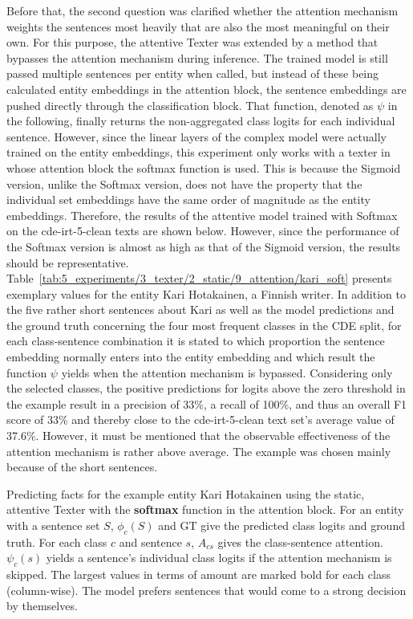 Before that, the second question was clarified whether the attention mechanism weights the sentences most heavily that are also the most meaningful on their own. For this purpose, the attentive Texter was extended by a method that bypasses the attention mechanism during inference. The trained model is still passed multiple sentences per entity when called, but instead of these being calculated entity embeddings in the attention block, the sentence embeddings are pushed directly through the classification block. That function, denoted as $\psi$ in the following, finally returns the non-aggregated class logits for each individual sentence. However, since the linear layers of the complex model were actually trained on the entity embeddings, this experiment only works with a texter in whose attention block the softmax function is used. This is because the Sigmoid version, unlike the Softmax version, does not have the property that the individual set embeddings have the same order of magnitude as the entity embeddings. Therefore, the results of the attentive model trained with Softmax on the cde-irt-5-clean texts are shown below. However, since the performance of the Softmax version is almost as high as that of the Sigmoid version, the results should be representative. Table~\ref{tab:5_experiments/3_texter/2_static/9_attention/kari_soft} presents exemplary values for the entity Kari Hotakainen, a Finnish writer. In addition to the five rather short sentences about Kari as well as the model predictions and the ground truth concerning the four most frequent classes in the CDE split, for each class-sentence combination it is stated to which proportion the sentence embedding normally enters into the entity embedding and which result the function $\psi$ yields when the attention mechanism is bypassed. Considering only the selected classes, the positive predictions for logits above the zero threshold in the example result in a precision of 33\%, a recall of 100\%, and thus an overall F1 score of 33\% and thereby close to the cde-irt-5-clean text set's average value of 37.6\%. However, it must be mentioned that the observable effectiveness of the attention mechanism is rather above average. The example was chosen mainly because of the short sentences.

\begin{table}[t]
    \centering
    
    \caption{Predicting facts for the example entity Kari Hotakainen using the static, attentive Texter with the \textbf{softmax} function in the attention block. For an entity with a sentence set $S$, $\phi_c(S)$ and GT give the predicted class logits and ground truth. For each class $c$ and sentence $s$, $A_{cs}$ gives the class-sentence attention. $\psi_c(s)$ yields a sentence's individual class logits if the attention mechanism is skipped. The largest values in terms of amount are marked bold for each class (column-wise). The model prefers sentences that would come to a strong decision by themselves.}
    \label{tab:5_experiments/3_texter/2_static/9_attention/kari_soft}
\end{table}

